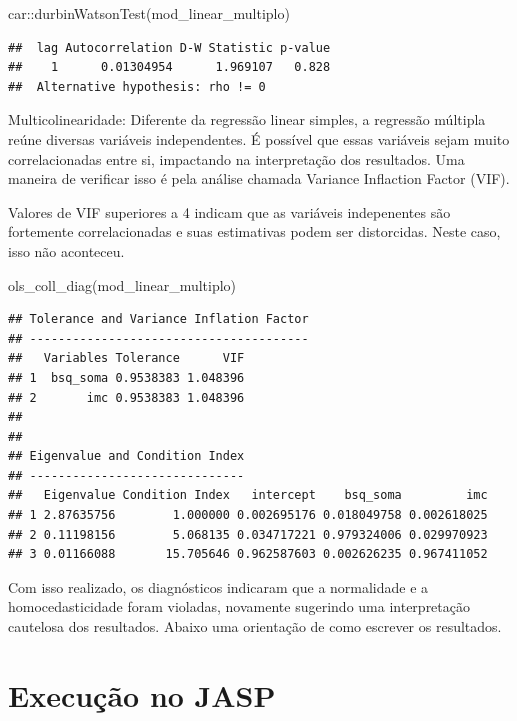 \documentclass[
]{book}
\newenvironment{Shaded}{\begin{snugshade}}{\end{snugshade}}
\newcommand{\FunctionTok}[1]{\textcolor[rgb]{0.00,0.00,0.00}{#1}}
\newcommand{\NormalTok}[1]{#1}
\newcommand{\SpecialCharTok}[1]{\textcolor[rgb]{0.00,0.00,0.00}{#1}}
\begin{document}
\begin{Shaded}
\begin{Highlighting}[]
\NormalTok{car}\SpecialCharTok{::}\FunctionTok{durbinWatsonTest}\NormalTok{(mod\_linear\_multiplo)}
\end{Highlighting}
\end{Shaded}

\begin{verbatim}
##  lag Autocorrelation D-W Statistic p-value
##    1      0.01304954      1.969107   0.828
##  Alternative hypothesis: rho != 0
\end{verbatim}

Multicolinearidade: Diferente da regressão linear simples, a regressão múltipla reúne diversas variáveis independentes. É possível que essas variáveis sejam muito correlacionadas entre si, impactando na interpretação dos resultados. Uma maneira de verificar isso é pela análise chamada Variance Inflaction Factor (VIF).

Valores de VIF superiores a 4 indicam que as variáveis indepenentes são fortemente correlacionadas e suas estimativas podem ser distorcidas. Neste caso, isso não aconteceu.

\begin{Shaded}
\begin{Highlighting}[]
\FunctionTok{ols\_coll\_diag}\NormalTok{(mod\_linear\_multiplo)}
\end{Highlighting}
\end{Shaded}

\begin{verbatim}
## Tolerance and Variance Inflation Factor
## ---------------------------------------
##   Variables Tolerance      VIF
## 1  bsq_soma 0.9538383 1.048396
## 2       imc 0.9538383 1.048396
## 
## 
## Eigenvalue and Condition Index
## ------------------------------
##   Eigenvalue Condition Index   intercept    bsq_soma         imc
## 1 2.87635756        1.000000 0.002695176 0.018049758 0.002618025
## 2 0.11198156        5.068135 0.034717221 0.979324006 0.029970923
## 3 0.01166088       15.705646 0.962587603 0.002626235 0.967411052
\end{verbatim}

Com isso realizado, os diagnósticos indicaram que a normalidade e a homocedasticidade foram violadas, novamente sugerindo uma interpretação cautelosa dos resultados. Abaixo uma orientação de como escrever os resultados.

\hypertarget{execuuxe7uxe3o-no-jasp-16}{%
\section{Execução no JASP}\label{execuuxe7uxe3o-no-jasp-16}}
\end{document}
